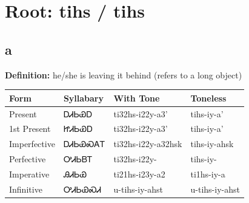 \documentclass{article}%
\begin{document}
%
\normalsize%
\section*{Root: tihs / tihs}%
\subsection*{a}%
\textbf{Definition: }%
he/she is leaving it behind (refers to a long object)%
\\[0.5em]%
\begin{tabular}{|l|l|l|l|}%
\hline%
\textbf{Form}&\textbf{Syllabary}&\textbf{With Tone}&\textbf{Toneless}\\%
\hline%
Present&ᎠᏗᏏᏯᎠ&ti32hs{-}i22y{-}a3'&tihs{-}iy{-}a'\\%
1st Present&ᏥᏗᏏᏯᎠ&ti32hs{-}i22y{-}a3'&tihs{-}iy{-}a'\\%
Imperfective&ᎠᏗᏏᏯᏍᎪᎢ&ti32hs{-}i22y{-}a32hsk&tihs{-}iy{-}ahsk\\%
Perfective&ᎤᏗᏏᏴᎢ&ti32hs{-}i22y{-}&tihs{-}iy{-}\\%
Imperative&ᎯᏗᏏᏯ&ti21hs{-}i23y{-}a2&ti1hs{-}iy{-}a\\%
Infinitive&ᎤᏗᏏᏯᏍᏗ&u{-}tihs{-}iy{-}ahst&u{-}tihs{-}iy{-}ahst\\%
\hline%
\end{tabular}%
\\[1em]%
\end{document}

